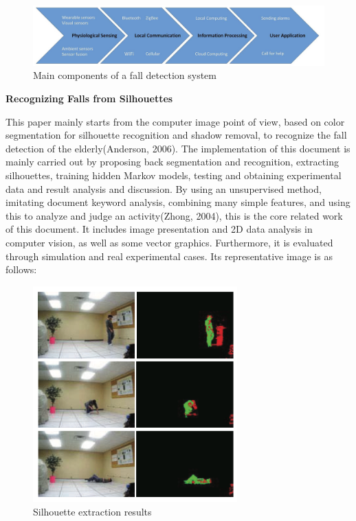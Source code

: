 \documentclass[12pt]{article}
\begin{document}
\begin{figure}[H]
\centering
\includegraphics[width=1\textwidth]{Paper1.pic.jpg}
\caption{Main components of a fall detection system} 
\end{figure}

\noindent \textbf{Recognizing Falls from Silhouettes}

\noindent This paper mainly starts from the computer image point of view, based on color segmentation for silhouette recognition and shadow removal, to recognize the fall detection of the elderly(Anderson, 2006). The implementation of this document is mainly carried out by proposing back segmentation and recognition, extracting silhouettes, training hidden Markov models, testing and obtaining experimental data and result analysis and discussion. By using an unsupervised method, imitating document keyword analysis, combining many simple features, and using this to analyze and judge an activity(Zhong, 2004), this is the core related work of this document. It includes image presentation and 2D data analysis in computer vision, as well as some vector graphics. Furthermore, it is evaluated through simulation and real experimental cases. Its representative image is as follows:

\begin{figure}[H]
\centering
\includegraphics[width=0.7\textwidth]{Paper2.pic.jpg}
\caption{Silhouette extraction results} 
\end{figure}
\end{document}
